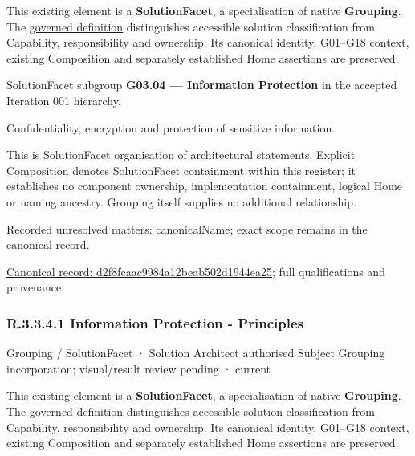 This existing element is a \textbf{SolutionFacet}, a specialisation of native
\textbf{Grouping}. The \href{\detokenize{../../../../../../../governance/continuum-representation.md#solutionfacet-classification--1119-candidate}}{governed definition}
distinguishes accessible solution classification from Capability, responsibility
and ownership. Its canonical identity, G01–G18 context, existing Composition
and separately established Home assertions are preserved.



SolutionFacet subgroup \textbf{G03.04 — Information Protection} in the accepted Iteration 001 hierarchy.



Confidentiality, encryption and protection of sensitive information.



This is SolutionFacet organisation of architectural statements. Explicit Composition denotes SolutionFacet containment within this register; it establishes no component ownership, implementation containment, logical Home or naming ancestry. Grouping itself supplies no additional relationship.


{\small Recorded unresolved matters: canonicalName; exact scope remains in the canonical record.}\par
{\footnotesize \href{../../../../../../../continuum/grouping/d2f8fcaac9984a12beab502d1944ea25.md}{Canonical record: d2f8fcaac9984a12beab502d1944ea25}; full qualifications and provenance.}\par
\subsubsection*{R.3.3.4.1 Information Protection - Principles}
\label{navigation:R.3.3.4.1}

\label{element:1cdc1ee62ec548998a8db6ee23b59ca1}
{\small Grouping / SolutionFacet · Solution Architect authorised Subject Grouping incorporation; visual/result review pending · current}\par

This existing element is a \textbf{SolutionFacet}, a specialisation of native
\textbf{Grouping}. The \href{\detokenize{../../../../../../../governance/continuum-representation.md#solutionfacet-classification--1119-candidate}}{governed definition}
distinguishes accessible solution classification from Capability, responsibility
and ownership. Its canonical identity, G01–G18 context, existing Composition
and separately established Home assertions are preserved.



